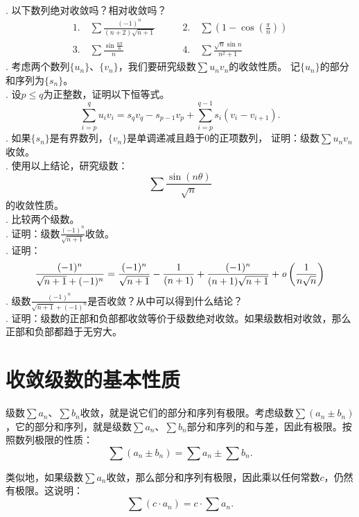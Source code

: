 \documentclass[12pt,UTF8,fontset=none]{ctexbook}
\begin{document}
\begin{xt}
    \mbox{} \\
    . 以下数列绝对收敛吗？相对收敛吗？\\
    $$
    \begin{array}{ll}
        1. \quad \sum \frac{(-1)^n}{(n + 2)\sqrt{n + 1}} \qquad &2. \quad \sum \left(1 - \cos{\left(\frac{\pi}{n}\right)}\right) \\
        3. \quad \sum \frac{\sin{\frac{n\pi}{6}}}{n} \qquad &4. \quad \sum \frac{\sqrt{n}\sin{n}}{n^2 + 1} 
    \end{array}
    $$ 
    . 考虑两个数列$\{u_n\}$、$\{v_n\}$，我们要研究级数$\sum u_n v_n$的收敛性质。
    记$\{u_n\}$的部分和序列为$\{s_n\}$。\\
    . 设$p \leqslant q$为正整数，证明以下恒等式。
    $$ \sum_{i=p}^q u_i v_i = s_q v_q - s_{p-1} v_p + \sum_{i=p}^{q-1} s_i (v_i - v_{i+1}). $$
    . 如果$\{s_n\}$是有界数列，$\{v_n\}$是单调递减且趋于$0$的正项数列，
    证明：级数$\sum u_n v_n$收敛。\\
    . 使用以上结论，研究级数：
    $$ \sum \frac{\sin{(n\theta)}}{\sqrt{n}}$$
    的收敛性质。\\
    . 比较两个级数。\\
    . 证明：级数$\frac{(-1)^n}{\sqrt{n + 1}}$收敛。\\
    . 证明：
    $$\frac{(-1)^n}{\sqrt{n + 1} + (-1)^n} = \frac{(-1)^n}{\sqrt{n + 1}} - \frac{1}{(n + 1)} + \frac{(-1)^n}{(n + 1)\sqrt{n + 1}} + \mathit{o}\left(\frac{1}{n\sqrt{n}}\right)$$
    . 级数$\frac{(-1)^n}{\sqrt{n + 1} + (-1)^n}$是否收敛？从中可以得到什么结论？\\
    . 证明：级数的正部和负部都收敛等价于级数绝对收敛。如果级数相对收敛，那么正部和负部都趋于无穷大。
    
\end{xt}

\section{收敛级数的基本性质}

级数$\sum a_n$、$\sum b_n$收敛，就是说它们的部分和序列有极限。考虑级数$\sum (a_n \pm b_n)$，它的部分和序列，就是级数$\sum a_n$、$\sum b_n$部分和序列的和与差，因此有极限。按照数列极限的性质：
$$\sum (a_n \pm b_n) = \sum a_n \pm \sum b_n.$$

类似地，如果级数$\sum a_n$收敛，那么部分和序列有极限，因此乘以任何常数$c$，仍然有极限。这说明：
$$\sum (c \cdot a_n) = c\cdot \sum a_n.$$
\end{document}
